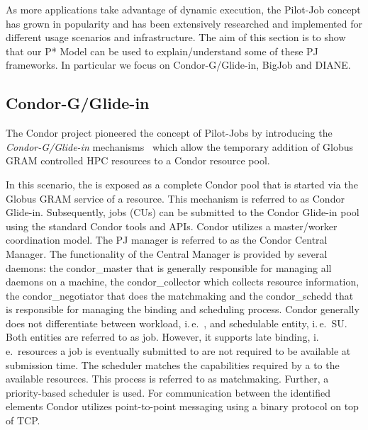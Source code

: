 \documentclass{sig-alternate}
\begin{document}
As more applications take advantage of dynamic execution, the
Pilot-Job concept has grown in popularity and has been extensively
researched and implemented for different usage scenarios and
infrastructure.  The aim of this section is to show that our P* Model
can be used to explain/understand some of these PJ frameworks. In
particular we focus on Condor-G/Glide-in, BigJob and DIANE.





\subsection{Condor-G/Glide-in}


The Condor project pioneered the concept of Pilot-Jobs by introducing 
the \textit{Condor-G/Glide-in} mechanisms~\cite{condor-g} which allow 
the temporary addition of Globus GRAM controlled HPC resources to a 
Condor resource pool.

In this scenario, the \pilot is exposed as a complete Condor pool that is started 
via the Globus GRAM service of a resource. This mechanism is referred to as Condor
Glide-in. Subsequently, jobs (CUs) can be submitted to the Condor Glide-in pool
using the standard Condor tools and APIs. Condor utilizes a
master/worker coordination model. The PJ manager is referred to as the
Condor Central Manager. The functionality of the Central Manager is
provided by several daemons: the condor\_master that is generally
responsible for managing all daemons on a machine, the
condor\_collector which collects resource information, the
condor\_negotiator that does the matchmaking and the condor\_schedd
that is responsible for managing the binding and scheduling
process. Condor generally does not differentiate between workload,
i.\,e.\ \cu, and schedulable entity, i.\,e.\ SU. Both entities are
referred to as job. However, it supports late binding, i.\,e.\
resources a job is eventually submitted to are not required to be available at
submission time. The scheduler matches the capabilities required by a
\cu to the available resources. This process is referred to as
matchmaking. Further, a priority-based scheduler is used. For
communication between the identified elements Condor utilizes
point-to-point messaging using a binary protocol on top of TCP.
\end{document}
